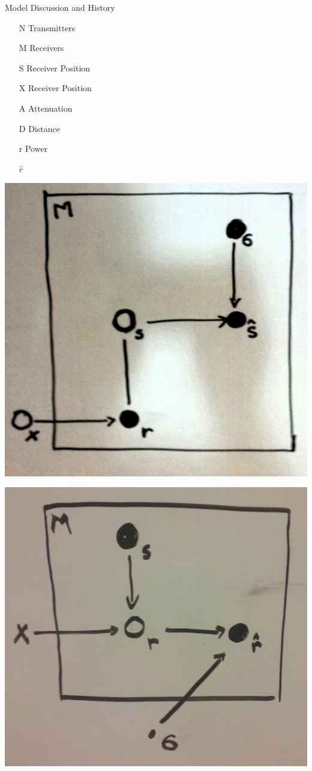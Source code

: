 \documentclass[11pt]{beamer}
\begin{document}
\begin{frame}{Model Discussion and History}
\begin{multicols}{3}
\begin{itemize}
\item[N] Transmitters
\item[M] Receivers
\item[S] Receiver Position
\item[X] Receiver Position
\item[A] Attenuation
\item[D] Distance
\item[r] Power
\item[$\hat{r}$]
\end{itemize}
\vfill
\columnbreak

\includegraphics[width=0.3\textheight]{pictures/0plate.jpg}

\includegraphics[width=0.3\textheight]{pictures/1plate.jpg}


\end{multicols}
\end{frame}
\end{document}
